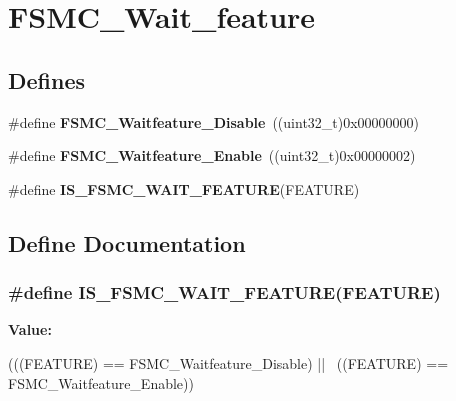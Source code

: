\hypertarget{group__FSMC__Wait__feature}{
\section{FSMC\_\-Wait\_\-feature}
\label{group__FSMC__Wait__feature}
}
\subsection*{Defines}
\begin{DoxyCompactItemize}
\item 
\hypertarget{group__FSMC__Wait__feature_ga8a31f05576e66546fbbcdb06ff67da7d}{
\#define {\bfseries FSMC\_\-Waitfeature\_\-Disable}~((uint32\_\-t)0x00000000)}
\label{group__FSMC__Wait__feature_ga8a31f05576e66546fbbcdb06ff67da7d}

\item 
\hypertarget{group__FSMC__Wait__feature_ga3113366130dfbf6d116f1afb94af1726}{
\#define {\bfseries FSMC\_\-Waitfeature\_\-Enable}~((uint32\_\-t)0x00000002)}
\label{group__FSMC__Wait__feature_ga3113366130dfbf6d116f1afb94af1726}

\item 
\#define {\bfseries IS\_\-FSMC\_\-WAIT\_\-FEATURE}(FEATURE)
\end{DoxyCompactItemize}


\subsection{Define Documentation}
\hypertarget{group__FSMC__Wait__feature_ga07c2585b517df2c7afbe3ba16c22f236}{
\subsubsection[{IS\_\-FSMC\_\-WAIT\_\-FEATURE}]{\setlength{\rightskip}{0pt plus 5cm}\#define IS\_\-FSMC\_\-WAIT\_\-FEATURE(FEATURE)}}
\label{group__FSMC__Wait__feature_ga07c2585b517df2c7afbe3ba16c22f236}
{\bfseries Value:}
\begin{DoxyCode}
(((FEATURE) == FSMC_Waitfeature_Disable) || \
                                       ((FEATURE) == FSMC_Waitfeature_Enable))
\end{DoxyCode}
